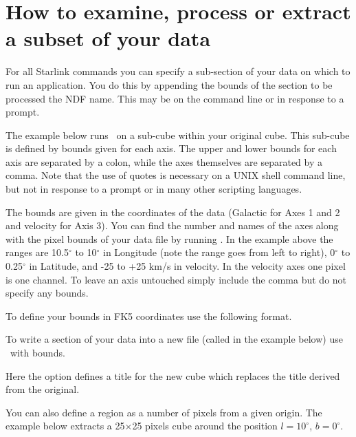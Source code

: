 \documentclass[11pt,oneside,chapters]{starlink}
\begin{document}
\section{How to examine, process or extract a subset of your data}
\label{sec:ndfsections}

For all Starlink commands you can specify a sub-section of your data
on which to run an application. You do this by appending the bounds of
the section to be processed the NDF name. This may be on the command
line or in response to a prompt.

The example below runs \stats\ on a sub-cube within your original
cube. This sub-cube is defined by bounds given for each axis. The
upper and lower bounds for each axis are separated by a colon, while
the axes themselves are separated by a comma. Note that the use of
quotes is necessary on a UNIX shell command line, but not in response
to a prompt or in many other scripting languages.

\begin{terminalv}
\end{terminalv}
The bounds are given in the coordinates of the data (Galactic for Axes
1 and 2 and velocity for Axis 3). You can find the number and names of
the axes along with the pixel bounds of your data file by running
\ndftrace. In the example above the ranges are 10.5$^\circ$ to
10$^\circ$ in Longitude (note the range goes from left to right),
0$^\circ$ to 0.25$^\circ$ in Latitude, and -25 to +25 km/s in
velocity. In the velocity axes one pixel is one channel. To leave an
axis untouched simply include the comma but do not specify any bounds.

To define your bounds in FK5 coordinates use the following format.
\begin{terminalv}
\end{terminalv}

To write a section of your data into a new file (called
 in the example below) use \ndfcopy\ with bounds.
\begin{terminalv}
\end{terminalv}
Here the option  defines a title for the new cube which
replaces the title derived from the original.

You can also define a region as a number of pixels from a given
origin. The example below extracts a 25$\times$25 pixels cube around
the position $l=10^\circ$, $b=0^\circ$.
\begin{terminalv}
\end{terminalv}
\end{document}
